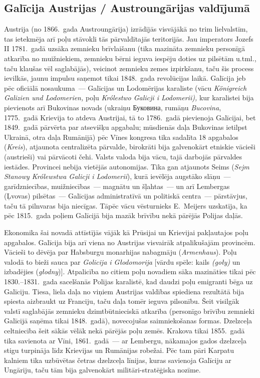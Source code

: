 \documentclass[twoside,a5paper,12pt,fleqn,openany]{extbook}
\newcommand{\pltxti}[1]{\textit{\textpolish{#1}}}
\newcommand{\detxti}[1]{\textit{\textgerman{#1}}}
\newcommand{\uktxti}[1]{\textukrainian{#1}}
\newcommand{\rotxti}[1]{\textit{\textromanian{#1}}}
\begin{document}
\subsection{Galīcija Austrijas / Austroungārijas valdījumā}

Austrija (no 1866.~gada Austroungārija) izrādījās visvājākā no trim lielvalstīm, tas ietekmēja arī poļu stāvokli tās pārvaldītajās teritorijās. Jau imperators Jozefs II 1781.~gadā uzsāka zemnieku brīvlaišanu (tika mazināta zemnieku personīgā atkarība no muižniekiem, zemnieku bērni ieguva iespēju doties uz pilsētām u.tml., taču klaušas vēl saglabājās), veicinot zemnieku zemes izpirkšanu, taču šis process ievilkās, jaunu impulsu saņemot tikai 1848.~gada revolūcijas laikā. Galīcija jeb pēc oficiālā nosaukuma~--- Galīcijas un Lodomērijas karaliste (vācu \detxti{Königreich Galizien und Lodomerien,} poļu \pltxti{Królestwo Galicji i Lodomerii),} kur karalistei bija pievienots arī Bukovinas novads (ukraiņu \uktxti{Буковина}, rumāņu \rotxti{Bucovina}, 1775.~gadā Krievija to atdeva Austrijai, tā to 1786.~gadā pievienoja Galīcijai, bet 1849.~gadā pārvērta par atsevišķu apgabalu; mūsdienās daļa Bukovinas ietilpst Ukrainā, otra daļa Rumānijā) pēc Vīnes kongresa tika sadalīta 18 apgabalos (\detxti{Kreis}), atjaunota centralizēta pārvalde, birokrāti bija galvenokārt etniskie vācieši (austrieši) vai pārvācoti čehi. Valsts valoda bija vācu, tajā darbojās pārvaldes iestādes. Provincei nebija vietējās autonomijas. Tika gan atjaunots Seims (\pltxti{Sejm Stanowy Królewstwa Galicji i Lodomerii}), kurā ievēlēja augstāko slāņu~--- garīdzniecības, muižniecības~--- magnātu un šļahtas~--- un arī Lembergas (Ļvovas) pilsētas~--- Galīcijas administratīvā un politiskā centra~--- pārstāvjus, taču tā pilnvaras bija niecīgas. Tāpēc vācu vēsturnieks E.~Meijers uzskatīja, ka pēc 1815.~gada poļiem Galīcijā bija mazāk brīvību nekā pārējās Polijas daļās.

Ekonomika šai novadā attīstījās vājāk kā Prūsijai un Krievijai pakļautajos poļu apgabalos. Galīcija bija arī viena no Austrijas visvairāk atpalikušajām provincēm. Vācieši to dēvēja par Habsburgu monarhijas nabagmāju (\detxti{Armenhaus}). Poļu valodā to bieži sauca par \pltxti{Golicija i Głodomorija} [vārdu spēle: kails \pltxti{(goły)} un izbadējies (\pltxti{głodny})]. Atpalicība no citiem poļu novadiem sāka mazināties tikai pēc 1830.--1831.~gada sacelšanās Polijas karalistē, kad daudzi poļu emigranti bēga uz Galīciju. Tiesa, liela daļa no viņiem Austrijas valdības spiediena rezultātā bija spiesta aizbraukt uz Franciju, taču daļa tomēr ieguva pilsonību. Šeit visilgāk valstī saglabājās zemnieku dzimtbūtnieciskā atkarība (personīgo brīvību zemnieki Galīcijā saņēma tikai 1848.~gadā), novecojušas saimniekošanas formas. Dzelzceļa celtniecība šeit sākās vēlāk nekā pārējās poļu zemēs. Krakova tikai 1855.~gadā tika savienota ar Vīni, 1861.~gadā~--- ar Lembergu, nākamajos gados dzelzceļa stigu turpināja līdz Krievijas un Rumānijas robežai. Pēc tam pāri Karpatu kalniem tika uzbūvētas četras dzelzceļa līnijas, kuras savienoja Galīciju ar Ungāriju, taču tām bija galvenokārt militāri-stratēģiska nozīme.
\end{document}
